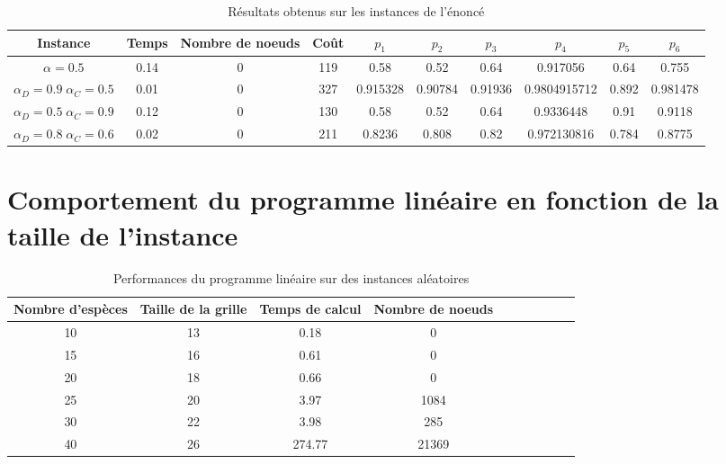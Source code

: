 \documentclass[12pt]{extarticle}
\begin{document}
\begin{table}[h!]
    \scriptsize
    \centering
    \begin{tabular}{|c|c|c|c|c|c|c|c|c|c|}
        \hline
        \textbf{Instance} & \textbf{Temps} & \textbf{Nombre de noeuds} & \textbf{Coût} & \textbf{$p_1$} & \textbf{$p_2$} & \textbf{$p_3$} & \textbf{$p_4$} & \textbf{$p_5$} & \textbf{$p_6$} \\
        \hline
        \textbf{$\alpha = 0.5$} & 0.14 & 0 & 119 & 0.58 & 0.52 & 0.64 & 0.917056 & 0.64 & 0.755 \\
        \hline
        \textbf{$\alpha_D = 0.9 \; \alpha_C = 0.5$} & 0.01 & 0 & 327 & 0.915328 & 0.90784 & 0.91936 & 0.9804915712 & 0.892 & 0.981478 \\
        \hline
        \textbf{$\alpha_D = 0.5 \; \alpha_C = 0.9$} & 0.12 & 0 & 130 & 0.58 & 0.52 & 0.64 & 0.9336448 & 0.91 & 0.9118 \\
        \hline
        \textbf{$\alpha_D = 0.8 \; \alpha_C = 0.6$} & 0.02 & 0 & 211 & 0.8236 & 0.808 & 0.82 & 0.972130816 & 0.784 & 0.8775 \\
        \hline
    \end{tabular}
    \caption{Résultats obtenus sur les instances de l'énoncé}
    \label{tab:table-1}
\end{table}

\section{Comportement du programme linéaire en fonction de la taille de l'instance}

\begin{table}[h!]
    \scriptsize
    \centering
    \begin{tabular}{|c|c|c|c|c|c|c|c|c|c|}
        \hline
        \textbf{Nombre d'espèces} & \textbf{Taille de la grille} & \textbf{Temps de calcul} & \textbf{Nombre de noeuds} \\
        \hline
        10 & 13 & 0.18 & 0 \\
        \hline
        15 & 16 & 0.61 & 0 \\
        \hline
        20 & 18 & 0.66 & 0 \\
        \hline
        25 & 20 & 3.97 & 1084 \\
        \hline
        30 & 22 & 3.98 & 285 \\
        \hline
        40 & 26 & 274.77 & 21369 \\
    \end{tabular}
    \caption{Performances du programme linéaire sur des instances aléatoires}
    \label{tab:table-2}
\end{table}
\end{document}
